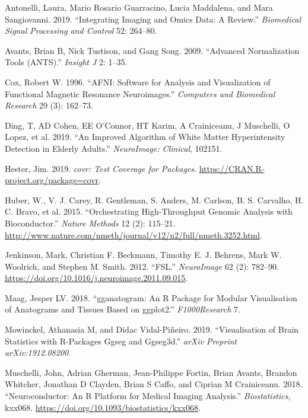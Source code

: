 \documentclass[]{elsarticle} %
\newlength{\cslhangindent}
\newenvironment{cslreferences}%
  {\setlength{\parindent}{0pt}%
  \everypar{\setlength{\hangindent}{\cslhangindent}}\ignorespaces}%
  {\par}
\begin{document}
\hypertarget{refs}{}
\begin{cslreferences}
\leavevmode\hypertarget{ref-antonelli2019integrating}{}%
Antonelli, Laura, Mario Rosario Guarracino, Lucia Maddalena, and Mara Sangiovanni. 2019. ``Integrating Imaging and Omics Data: A Review.'' \emph{Biomedical Signal Processing and Control} 52: 264--80.

\leavevmode\hypertarget{ref-avants2009advanced}{}%
Avants, Brian B, Nick Tustison, and Gang Song. 2009. ``Advanced Normalization Tools (ANTS).'' \emph{Insight J} 2: 1--35.

\leavevmode\hypertarget{ref-afni}{}%
Cox, Robert W. 1996. ``AFNI: Software for Analysis and Visualization of Functional Magnetic Resonance Neuroimages.'' \emph{Computers and Biomedical Research} 29 (3): 162--73.

\leavevmode\hypertarget{ref-ding2019improved}{}%
Ding, T, AD Cohen, EE O'Connor, HT Karim, A Crainiceanu, J Muschelli, O Lopez, et al. 2019. ``An Improved Algorithm of White Matter Hyperintensity Detection in Elderly Adults.'' \emph{NeuroImage: Clinical}, 102151.

\leavevmode\hypertarget{ref-covr}{}%
Hester, Jim. 2019. \emph{covr: Test Coverage for Packages}. \url{https://CRAN.R-project.org/package=covr}.

\leavevmode\hypertarget{ref-bioconductor}{}%
Huber, W., V. J. Carey, R. Gentleman, S. Anders, M. Carlson, B. S. Carvalho, H. C. Bravo, et al. 2015. ``Orchestrating High-Throughput Genomic Analysis with Bioconductor.'' \emph{Nature Methods} 12 (2): 115--21. \url{http://www.nature.com/nmeth/journal/v12/n2/full/nmeth.3252.html}.

\leavevmode\hypertarget{ref-fsl}{}%
Jenkinson, Mark, Christian F. Beckmann, Timothy E. J. Behrens, Mark W. Woolrich, and Stephen M. Smith. 2012. ``FSL.'' \emph{NeuroImage} 62 (2): 782--90. \url{https://doi.org/10.1016/j.neuroimage.2011.09.015}.

\leavevmode\hypertarget{ref-maag2018gganatogram}{}%
Maag, Jesper LV. 2018. ``gganatogram: An R Package for Modular Visualisation of Anatograms and Tissues Based on ggplot2.'' \emph{F1000Research} 7.

\leavevmode\hypertarget{ref-mowinckel2019visualisation}{}%
Mowinckel, Athanasia M, and Didac Vidal-Piñeiro. 2019. ``Visualisation of Brain Statistics with R-Packages Ggseg and Ggseg3d.'' \emph{arXiv Preprint arXiv:1912.08200}.

\leavevmode\hypertarget{ref-neuroconductor}{}%
Muschelli, John, Adrian Gherman, Jean-Philippe Fortin, Brian Avants, Brandon Whitcher, Jonathan D Clayden, Brian S Caffo, and Ciprian M Crainiceanu. 2018. ``Neuroconductor: An R Platform for Medical Imaging Analysis.'' \emph{Biostatistics}, kxx068. \url{https://doi.org/10.1093/biostatistics/kxx068}.


\end{cslreferences}
\end{document}
